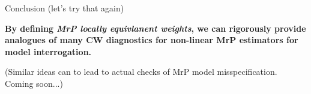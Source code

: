 \begin{frame}[t]{Conclusion (let's try that again)}

\textbf{
By defining \textit{MrP locally equivlanent weights}, we can rigorously provide
analogues of many CW diagnostics for non-linear MrP estimators for model interrogation.\\[1em]
}

(Similar ideas can to lead to actual checks of MrP model misspecification.  Coming soon...)



\end{frame}



